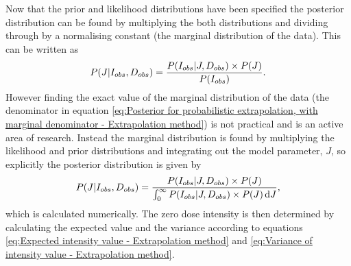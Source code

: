 Now that the prior and likelihood distributions have been specified the posterior distribution can be found by multiplying the both distributions and dividing through by a normalising constant (the marginal distribution of the data).
This can be written as
\begin{equation}
P(J|I_{obs},D_{obs}) = \frac{P(I_{obs} | J, D_{obs}) \times P(J)}{P(I_{obs})}.
\label{eq:Posterior for probabilistic extrapolation, with marginal denominator - Extrapolation method}
\end{equation}
However finding the exact value of the marginal distribution of the data (the denominator in equation \ref{eq:Posterior for probabilistic extrapolation, with marginal denominator - Extrapolation method}) is not practical and is an active area of research.
Instead the marginal distribution is found by multiplying the likelihood and prior distributions and integrating out the model parameter, $J$, so explicitly the posterior distribution is given by
\begin{equation}
P(J|I_{obs},D_{obs}) = \frac{P(I_{obs} | J, D_{obs}) \times P(J)}{\int_0^{\infty} P(I_{obs} | J, D_{obs}) \times P(J)\, \mathrm{d}J},
\label{eq:Posterior for probabilistic extrapolation, explicit - Extrapolation method}
\end{equation}
which is calculated numerically.
The zero dose intensity is then determined by calculating the expected value and the variance according to equations \ref{eq:Expected intensity value - Extrapolation method} and \ref{eq:Variance of intensity value - Extrapolation method}.

